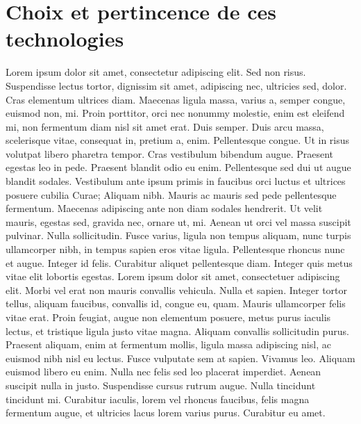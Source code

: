 \section{Choix et pertincence de ces technologies}
Lorem ipsum dolor sit amet, consectetur adipiscing elit. Sed non risus. Suspendisse lectus tortor, dignissim sit amet, adipiscing nec, ultricies sed, dolor. Cras elementum ultrices diam. Maecenas ligula massa, varius a, semper congue, euismod non, mi. Proin porttitor, orci nec nonummy molestie, enim est eleifend mi, non fermentum diam nisl sit amet erat. Duis semper. Duis arcu massa, scelerisque vitae, consequat in, pretium a, enim. Pellentesque congue. Ut in risus volutpat libero pharetra tempor. Cras vestibulum bibendum augue. Praesent egestas leo in pede. Praesent blandit odio eu enim. Pellentesque sed dui ut augue blandit sodales. Vestibulum ante ipsum primis in faucibus orci luctus et ultrices posuere cubilia Curae; Aliquam nibh. Mauris ac mauris sed pede pellentesque fermentum. Maecenas adipiscing ante non diam sodales hendrerit. Ut velit mauris, egestas sed, gravida nec, ornare ut, mi. Aenean ut orci vel massa suscipit pulvinar. Nulla sollicitudin. Fusce varius, ligula non tempus aliquam, nunc turpis ullamcorper nibh, in tempus sapien eros vitae ligula. Pellentesque rhoncus nunc et augue. Integer id felis. Curabitur aliquet pellentesque diam. Integer quis metus vitae elit lobortis egestas. Lorem ipsum dolor sit amet, consectetuer adipiscing elit. Morbi vel erat non mauris convallis vehicula. Nulla et sapien. Integer tortor tellus, aliquam faucibus, convallis id, congue eu, quam. Mauris ullamcorper felis vitae erat. Proin feugiat, augue non elementum posuere, metus purus iaculis lectus, et tristique ligula justo vitae magna. Aliquam convallis sollicitudin purus. Praesent aliquam, enim at fermentum mollis, ligula massa adipiscing nisl, ac euismod nibh nisl eu lectus. Fusce vulputate sem at sapien. Vivamus leo. Aliquam euismod libero eu enim. Nulla nec felis sed leo placerat imperdiet. Aenean suscipit nulla in justo. Suspendisse cursus rutrum augue. Nulla tincidunt tincidunt mi. Curabitur iaculis, lorem vel rhoncus faucibus, felis magna fermentum augue, et ultricies lacus lorem varius purus. Curabitur eu amet.


